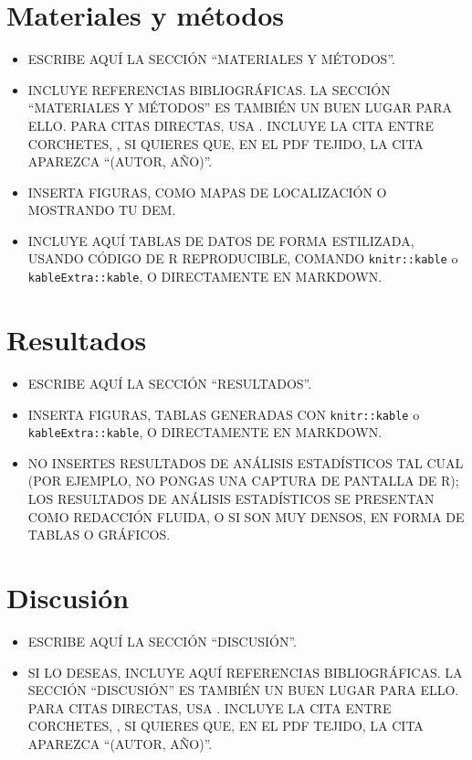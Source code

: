\documentclass[spanish]{article}
\begin{document}
\section{Materiales y métodos}\label{materiales-y-muxe9todos}

\begin{itemize}
\item
  ESCRIBE AQUÍ LA SECCIÓN ``MATERIALES Y MÉTODOS''.
\item
  INCLUYE REFERENCIAS BIBLIOGRÁFICAS. LA SECCIÓN ``MATERIALES Y
  MÉTODOS'' ES TAMBIÉN UN BUEN LUGAR PARA ELLO. PARA CITAS DIRECTAS, USA
  \textcite{ETIQUETA_BIBTEX}. INCLUYE LA CITA ENTRE CORCHETES,
  \autocite{ETIQUETA_BIBTEX}, SI QUIERES QUE, EN EL PDF TEJIDO, LA CITA
  APAREZCA ``(AUTOR, AÑO)''.
\item
  INSERTA FIGURAS, COMO MAPAS DE LOCALIZACIÓN O MOSTRANDO TU DEM.
\item
  INCLUYE AQUÍ TABLAS DE DATOS DE FORMA ESTILIZADA, USANDO CÓDIGO DE R
  REPRODUCIBLE, COMANDO \texttt{knitr::kable} o
  \texttt{kableExtra::kable}, O DIRECTAMENTE EN MARKDOWN.
\end{itemize}

\section{Resultados}\label{resultados}

\begin{itemize}
\item
  ESCRIBE AQUÍ LA SECCIÓN ``RESULTADOS''.
\item
  INSERTA FIGURAS, TABLAS GENERADAS CON \texttt{knitr::kable} o
  \texttt{kableExtra::kable}, O DIRECTAMENTE EN MARKDOWN.
\item
  NO INSERTES RESULTADOS DE ANÁLISIS ESTADÍSTICOS TAL CUAL (POR EJEMPLO,
  NO PONGAS UNA CAPTURA DE PANTALLA DE R); LOS RESULTADOS DE ANÁLISIS
  ESTADÍSTICOS SE PRESENTAN COMO REDACCIÓN FLUIDA, O SI SON MUY DENSOS,
  EN FORMA DE TABLAS O GRÁFICOS.
\end{itemize}

\section{Discusión}\label{discusiuxf3n}

\begin{itemize}
\item
  ESCRIBE AQUÍ LA SECCIÓN ``DISCUSIÓN''.
\item
  SI LO DESEAS, INCLUYE AQUÍ REFERENCIAS BIBLIOGRÁFICAS. LA SECCIÓN
  ``DISCUSIÓN'' ES TAMBIÉN UN BUEN LUGAR PARA ELLO. PARA CITAS DIRECTAS,
  USA \textcite{ETIQUETA_BIBTEX}. INCLUYE LA CITA ENTRE CORCHETES,
  \autocite{ETIQUETA_BIBTEX}, SI QUIERES QUE, EN EL PDF TEJIDO, LA CITA
  APAREZCA ``(AUTOR, AÑO)''.
\end{itemize}
\end{document}
